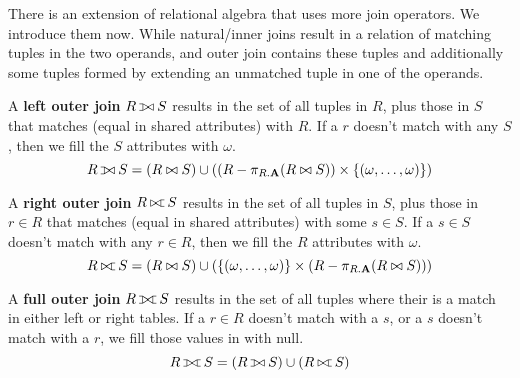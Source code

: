     There is an extension of relational algebra that uses more join operators. We introduce them now. While natural/inner joins result in a relation of matching tuples in the two operands, and outer join contains these tuples and additionally some tuples formed by extending an unmatched tuple in one of the operands. 

    \begin{definition}
      A \textbf{left outer join} $R \lojoin S$ results in the set of all tuples in $R$, plus those in $S$ that matches (equal in shared attributes) with $R$. If a $r$ doesn't match with any $S$, then we fill the $S$ attributes with $\omega$. 
      \begin{equation}
        R \lojoin S = (R \bowtie S) \cup ( (R - \pi_{R.\mathbf{A}} (R \bowtie S)) \times \{(\omega, \ldots, \omega)\})
      \end{equation}
    \end{definition} 

    \begin{definition}
      A \textbf{right outer join} $R \rojoin S$ results in the set of all tuples in $S$, plus those in $r \in R$ that matches (equal in shared attributes) with some $s \in S$. If a $s \in S$ doesn't match with any $r \in R$, then we fill the $R$ attributes with $\omega$. 
      \begin{equation}
        R \rojoin S = (R \bowtie S) \cup ( \{(\omega, \ldots, \omega)\} \times (R - \pi_{R.\mathbf{A}} (R \bowtie S)))
      \end{equation}
    \end{definition}

    \begin{definition}
      A \textbf{full outer join} $R \fojoin S$ results in the set of all tuples where their is a match in either left or right tables. If a $r \in R$ doesn't match with a $s$, or a $s$ doesn't match with a $r$, we fill those values in with null. 
      \begin{equation}
        R \fojoin S = (R \lojoin S) \cup (R \rojoin S)
      \end{equation}
    \end{definition}

